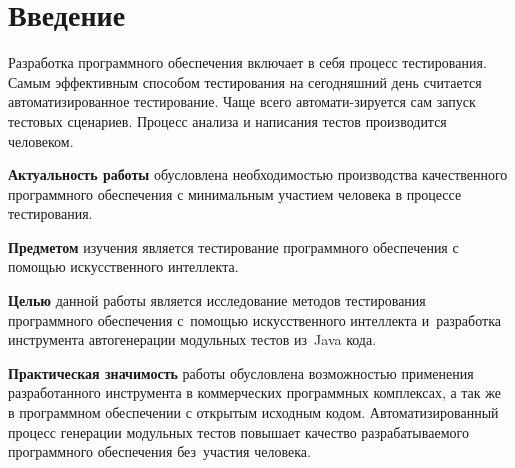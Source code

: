 \chapter*{Введение}                         %


\hspace*{2.5em}Разработка программного обеспечения включает в себя процесс тестирования. Самым эффективным способом тестирования на сегодняшний день считается автоматизированное тестирование. Чаще всего автомати-зируется сам запуск тестовых сценариев. Процесс анализа и написания тестов производится человеком.

\textbf{Актуальность работы} обусловлена необходимостью производства качественного программного обеспечения с минимальным участием человека в процессе тестирования.

\textbf{Предметом} изучения является тестирование программного обеспечения с помощью искусственного интеллекта. 

\textbf{Целью} данной работы является исследование методов тестирования программного обеспечения с~помощью искусственного интеллекта и~разработка инструмента автогенерации модульных тестов из~Java кода.​

\textbf{Практическая значимость} работы обусловлена возможностью применения разработанного инструмента в коммерческих программных комплексах, а так же в программном обеспечении с открытым исходным кодом. Автоматизированный процесс генерации модульных тестов повышает качество разрабатываемого программного обеспечения без~участия человека.


%
